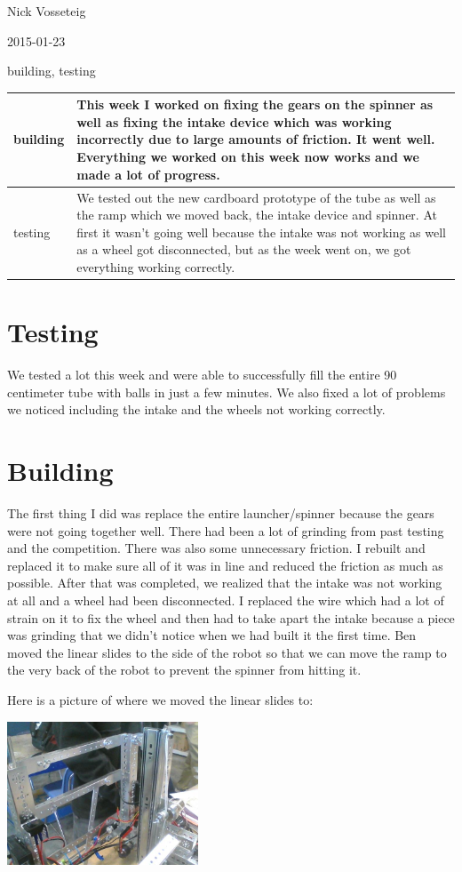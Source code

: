Nick Vosseteig

2015-01-23

building, testing

\begin{tabular}{|p{5cm}|p{5cm}|}
 \hline
 building&
This week I worked on fixing the gears on the spinner as well as fixing the intake device which was working incorrectly due to large amounts of friction. It went well. Everything we worked on this week now works and we made a lot of progress. 
 \\
 \hline
testing&
We tested out the new cardboard prototype of the tube as well as the ramp which we moved back, the intake device and spinner. At first it wasn’t going well because the intake was not working as well as a wheel got disconnected, but as the week went on, we got everything working correctly.
 \\
 \hline
\end{tabular}

\section*{Testing}
We tested a lot this week and were able to successfully fill the entire 90 centimeter tube with balls in just a few minutes. We also fixed a lot of problems we noticed including the intake and the wheels not working correctly. 


\section*{Building}
	The first thing I did was replace the entire launcher/spinner because the gears were not going together well. There had been a lot of grinding from past testing and the competition. There was also some unnecessary friction. I rebuilt and replaced it to make sure all of it was in line and reduced the friction as much as possible. After that was completed, we realized that the intake was not working at all and a wheel had been disconnected. I replaced the wire which had a lot of strain on it to fix the wheel and then had to take apart the intake because a piece was grinding that we didn’t notice when we had built it the first time. Ben moved the linear slides to the side of the robot so that we can move the ramp to the very back of the robot to prevent the spinner from hitting it.

Here is a picture of where we moved the linear slides to:
\begin{center}
 \includegraphics[width=215px]{./Entries/Images/slidesonside.jpg}
\end{center}